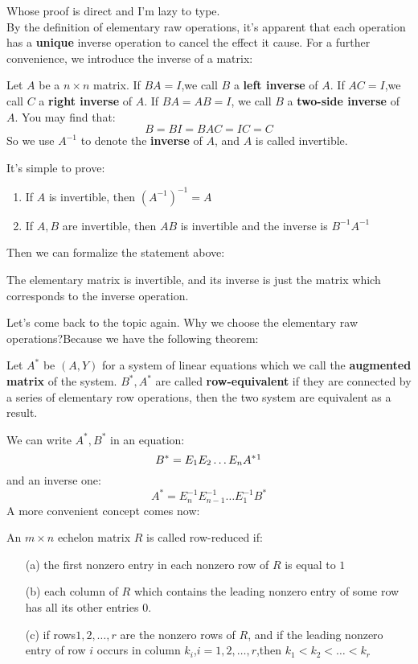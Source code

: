 \documentclass{article}
\begin{document}
Whose proof is direct and I'm lazy to type.\\
\indent By the definition of elementary raw operations, it's apparent that each operation has a \textbf{unique} inverse operation to cancel the effect it cause. 
\indent For a further convenience, we introduce the inverse of a matrix:
\begin{dde}
	Let $A$ be a $n\times n$ matrix. If $BA=I$,we call $B$ a \textbf{left inverse} of $A$. If $AC=I$,we call $C$ a \textbf{right inverse} of $A$. If $BA=AB=I$, we call $B$ a \textbf{two-side inverse} of $A$. You may find that:\[B=BI=BAC=IC=C\]So we use $A^{-1}$ to denote the \textbf{inverse} of $A$, and $A$ is called invertible.
\end{dde}
It's simple to prove:
\begin{thm}
\begin{enumerate}
	\item If $A$ is invertible, then $(A^{-1})^{-1}=A$
	\item If $A,B$ are invertible, then $AB$ is invertible and the inverse is $B^{-1}A^{-1}$ 
\end{enumerate}
\end{thm}
Then we can formalize the statement above:
\begin{thm}
	The elementary matrix is invertible, and its inverse is just the matrix which corresponds to the inverse operation.
\end{thm}
Let's come back to the topic again. Why we choose the elementary raw operations?Because we have the following theorem:
\begin{thm}
	Let $A^*$ be $(A,Y)$ for a system of linear equations which we call the \textbf{augmented matrix} of the system. $B^*,A^*$ are called \textbf{row-equivalent} if they are connected by a series of elementary row operations, then the two system are equivalent as a result.
\end{thm}
We can write $A^*,B^*$ in an equation:\[B^*=E_1E_2\dots E_nA^*\footnote{the foot scripts here don't mean the dimension}\]
and an inverse one:\[A^*=E_n^{-1}E_{n-1}^{-1}\dots E_1^{-1}B^*\]
\indent A more convenient concept comes now:
\begin{dde}
	An $m\times n$ echelon matrix $R$ is called row-reduced if:
	\begin{enumerate}
		\item[(a)] the first nonzero entry in each nonzero row of $R$ is equal to $1$
		\item[(b)] each column of $R$ which contains the leading nonzero entry of some row has all its other entries $0$.
		\item[(c)] if rows$1,2,\dots,r$ are the nonzero rows of $R$, and if the leading nonzero entry of row $i$ occurs in column $k_i$,$i=1,2,\dots,r$,then $k_1<k_2<\dots<k_r$
	\end{enumerate}
\end{dde}
\end{document}
